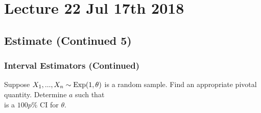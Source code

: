 \documentclass[notoc,notitlepage]{tufte-book}
\begin{document}



\chapter{Lecture 22 Jul 17th 2018}%
\label{chp:lecture_22_jul_17th_2018}

\section{Estimate (Continued 5)}%
\label{sec:estimate_continued_5}

\subsection{Interval Estimators (Continued)}%
\label{sub:interval_estimators_continued}

\begin{eg}[Example 6.21]
  Suppose $X_1, ..., X_n \sim \operatorname{Exp}(1, \theta)$ is a random sample. Find an appropriate pivotal quantity. Determine $a$ such that
  \begin{equation*}
    [ \hat{\theta} - a, \, \hat{\theta} ]
  \end{equation*}
  is a $100p\%$ CI for $\theta$.
\end{eg}
\end{document}
